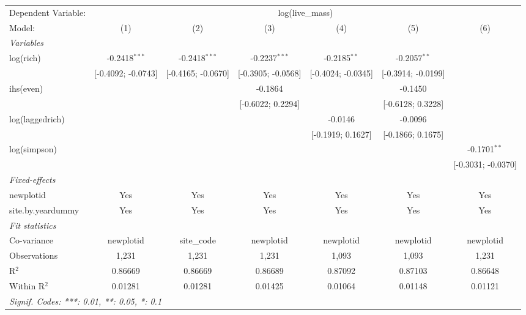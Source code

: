 \begin{tabular}{lcccccc}
\tabularnewline\midrule\midrule
Dependent Variable:&\multicolumn{6}{c}{log(live\_mass)}\\
Model:&(1) & (2) & (3) & (4) & (5) & (6)\\
\midrule \emph{Variables}&   &   &   &   &   &  \\
log(rich)&-0.2418$^{***}$ & -0.2418$^{***}$ & -0.2237$^{***}$ & -0.2185$^{**}$ & -0.2057$^{**}$ &   \\
  &[-0.4092; -0.0743] & [-0.4165; -0.0670] & [-0.3905; -0.0568] & [-0.4024; -0.0345] & [-0.3914; -0.0199] &   \\
ihs(even)&   &    & -0.1864 &    & -0.1450 &   \\
  &   &    & [-0.6022; 0.2294] &    & [-0.6128; 0.3228] &   \\
log(laggedrich)&   &    &    & -0.0146 & -0.0096 &   \\
  &   &    &    & [-0.1919; 0.1627] & [-0.1866; 0.1675] &   \\
log(simpson)&   &    &    &    &    & -0.1701$^{**}$\\
  &   &    &    &    &    & [-0.3031; -0.0370]\\
\midrule \emph{Fixed-effects}&   &   &   &   &   &  \\
newplotid & Yes & Yes & Yes & Yes & Yes & Yes\\
site.by.yeardummy & Yes & Yes & Yes & Yes & Yes & Yes\\
\midrule \emph{Fit statistics}&  & & & & & \\
Co-variance& newplotid&site\_code&newplotid&newplotid&newplotid&newplotid\\
Observations & 1,231&1,231&1,231&1,093&1,093&1,231\\
R$^2$ & 0.86669&0.86669&0.86689&0.87092&0.87103&0.86648\\
Within R$^2$ & 0.01281&0.01281&0.01425&0.01064&0.01148&0.01121\\
\midrule\midrule\multicolumn{7}{l}{\emph{Signif. Codes: ***: 0.01, **: 0.05, *: 0.1}}\\
\end{tabular}


